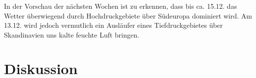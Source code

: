 \documentclass[12pt,a4paper,titlepage,headinclude,bibtotoc]{scrartcl}
\begin{document}
In der Vorschau der nächsten Wochen ist zu erkennen, dass bis ca. 15.12. das Wetter überwiegend durch Hochdruckgebiete über Südeuropa dominiert wird.
Am 13.12. wird jedoch vermutlich ein Ausläufer eines Tiefdruckgebietes über Skandinavien uns kalte feuchte Luft bringen.






\section{Diskussion}
\label{sec:diskussion}



\end{document}
